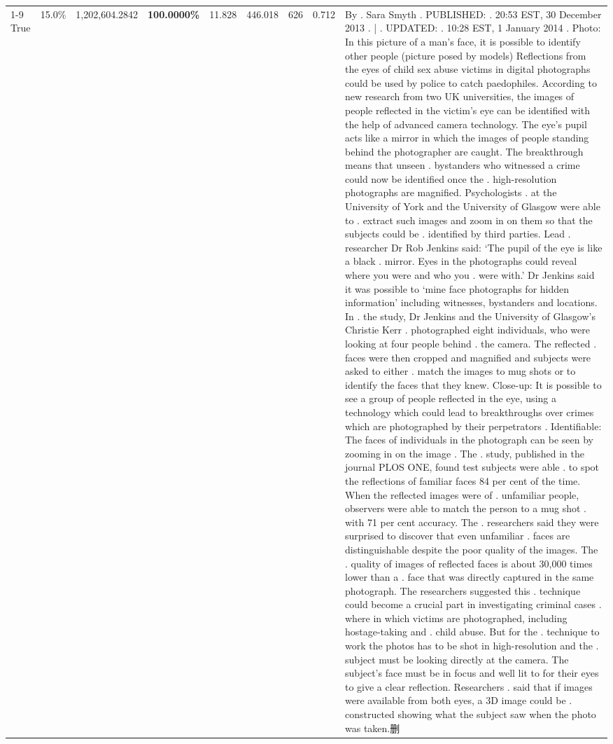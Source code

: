 \begin{table}[H]
\begin{tabular}{lllrlllll}
\cline{1-9}
True & 15.0\% & 1,202,604.2842 & \bfseries \color{red} 100.0000\% & 11.828 & 446.018 & 626 & 0.712 & By . Sara Smyth . PUBLISHED: . 20:53 EST, 30 December 2013 . | . UPDATED: . 10:28 EST, 1 January 2014 . Photo: In this picture of a man's face, it is possible to identify other people (picture posed by models) Reflections from the eyes of child sex abuse victims in digital photographs could be used by police to catch paedophiles. According to new research from two UK universities, the images of people reflected in the victim's eye can be identified with the help of advanced camera technology. The eye's pupil acts like a mirror in which the images of people standing behind the photographer are caught. The breakthrough means that unseen . bystanders who witnessed a crime could now be identified once the . high-resolution photographs are magnified. Psychologists . at the University of York and the University of Glasgow were able to . extract such images and zoom in on them so that the subjects could be . identified by third parties. Lead . researcher Dr Rob Jenkins said: ‘The pupil of the eye is like a black . mirror. Eyes in the photographs could reveal where you were and who you . were with.' Dr Jenkins said it was possible to ‘mine face photographs for hidden information' including witnesses, bystanders and locations. In . the study, Dr Jenkins and the University of Glasgow's Christie Kerr . photographed eight individuals, who were looking at four people behind . the camera. The reflected . faces were then cropped and magnified and subjects were asked to either . match the images to mug shots or to identify the faces that they knew. Close-up: It is possible to see a group of people reflected in the eye, using a technology which could lead to breakthroughs over crimes which are photographed by their perpetrators . Identifiable: The faces of individuals in the photograph can be seen by zooming in on the image . The . study, published in the journal PLOS ONE, found test subjects were able . to spot the reflections of familiar faces 84 per cent of the time. When the reflected images were of . unfamiliar people, observers were able to match the person to a mug shot . with 71 per cent accuracy. The . researchers said they were surprised to discover that even unfamiliar . faces are distinguishable despite the poor quality of the images. The . quality of images of reflected faces is about 30,000 times lower than a . face that was directly captured in the same photograph. The researchers suggested this . technique could become a crucial part in investigating criminal cases . where in which victims are photographed, including hostage-taking and . child abuse. But for the . technique to work the photos has to be shot in high-resolution and the . subject must be looking directly at the camera. The subject's face must be in focus and well lit to for their eyes to give a clear reflection. Researchers . said that if images were available from both eyes, a 3D image could be . constructed showing what the subject saw when the photo was taken.删 \\

\end{tabular}
\end{table}
